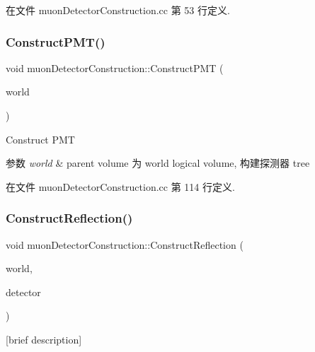在文件 muon\+Detector\+Construction.\+cc 第 53 行定义.

\mbox{\label{classmuonDetectorConstruction_adaaf850335c5d3013e8e98270610e7b3}} 
\subsubsection{\texorpdfstring{Construct\+P\+M\+T()}{ConstructPMT()}}
{\footnotesize\ttfamily void muon\+Detector\+Construction\+::\+Construct\+P\+MT (\begin{DoxyParamCaption}\item[{G4\+Logical\+Volume $\ast$}]{world }\end{DoxyParamCaption})}



Construct P\+MT 


\begin{DoxyParams}{参数}
{\em world} & parent volume 为 world logical volume, 构建探测器 tree \\
\hline
\end{DoxyParams}


在文件 muon\+Detector\+Construction.\+cc 第 114 行定义.

\mbox{\label{classmuonDetectorConstruction_ae448b2b2b572072f685b4cdf75d4f60a}} 
\subsubsection{\texorpdfstring{Construct\+Reflection()}{ConstructReflection()}}
{\footnotesize\ttfamily void muon\+Detector\+Construction\+::\+Construct\+Reflection (\begin{DoxyParamCaption}\item[{G4\+Logical\+Volume $\ast$}]{world,  }\item[{G4\+Trd $\ast$}]{detector }\end{DoxyParamCaption})}



\mbox{[}brief description\mbox{]} 

